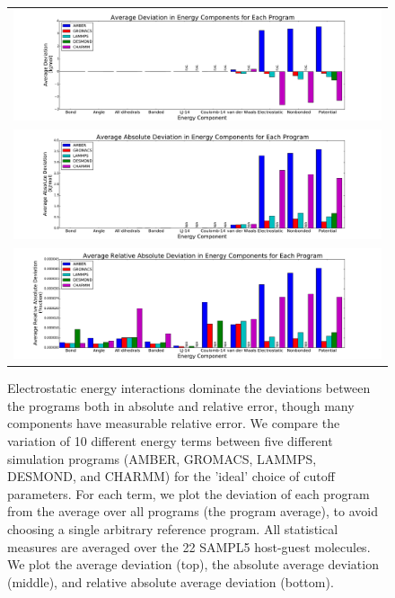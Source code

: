 \begin{figure}[h]
\begin{tabular}{c}
\includegraphics[width=\textwidth]{AverageIdealSettings.pdf} \\  
\includegraphics[width=\textwidth]{AverageAbsoluteIdealSettings.pdf} \\  
\includegraphics[width=\textwidth]{AverageRelativeAbsoluteIdealSettings.pdf}
\end{tabular}
\caption{Electrostatic energy interactions dominate the deviations
  between the programs both in absolute and relative error, though
  many components have measurable relative error. We compare the
  variation of 10 different energy terms between five different
  simulation programs (AMBER, GROMACS, LAMMPS, DESMOND, and CHARMM)
  for the 'ideal' choice of cutoff parameters. For each term, we plot
  the deviation of each program from the average over all programs
  (the program average), to avoid choosing a single arbitrary
  reference program. All statistical measures are averaged over the 22 SAMPL5
  host-guest molecules. We plot the average deviation (top), the
  absolute average deviation (middle), and relative absolute average
  deviation (bottom).
\label{fig:mainfig}}
\end{figure}

